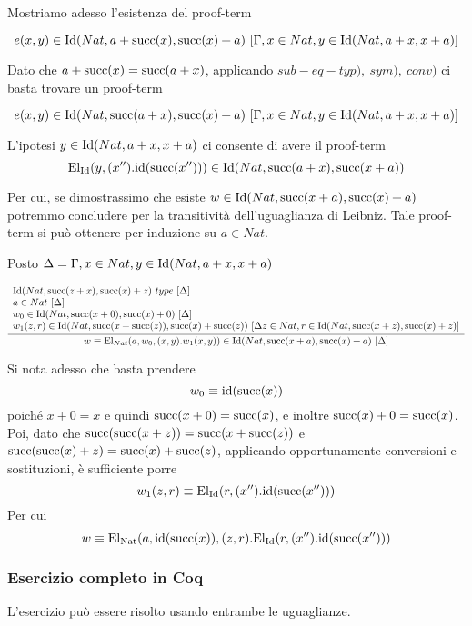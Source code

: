 Mostriamo adesso l'esistenza del proof-term 

\[e(x, y)\in \mathrm{Id}(Nat, a+\mathrm{succ}(x), \mathrm{succ}(x)+a)\ [\Gamma, x\in Nat, y\in \mathrm{Id}(Nat, a+x, x+a)]\]

Dato che $a+\mathrm{succ}(x) = \mathrm{succ}(a+x)$, applicando $sub-eq-typ),\ sym),\ conv)$ ci basta trovare un proof-term

\[e(x, y)\in \mathrm{Id}(Nat, \mathrm{succ}(a+x), \mathrm{succ}(x)+a)\ [\Gamma, x\in Nat, y\in \mathrm{Id}(Nat, a+x, x+a)]\]

L'ipotesi $y \in \mathrm{Id}(Nat, a+x, x+a)$ ci consente di avere il proof-term
\[ \mathrm{El}_{\mathrm{Id}}(y, (x'').\mathrm{id}(\mathrm{succ}(x''))) \in \mathrm{Id}(Nat, \mathrm{succ}(a+x), \mathrm{succ}(x+a))\]

Per cui, se dimostrassimo che esiste $w \in \mathrm{Id}(Nat, \mathrm{succ}(x+a), \mathrm{succ}(x)+a)$ potremmo concludere per la transitività dell'uguaglianza di Leibniz. Tale proof-term si può ottenere per induzione su $a\in Nat$.

Posto $\Delta = \Gamma, x\in Nat, y\in \mathrm{Id}(Nat, a+x, x+a)$

\begin{scriptsize}
	\[ \infer{w \equiv \mathrm{El}_{Nat}(a, w_0, (x, y).w_1(x,y)) \in \Id{Nat}{\suc{x+a}}{\suc{x}+a}\ [\Delta]}{\begin{array}{l}
		\Id{Nat}{\suc{z+x}}{\suc{x}+z}\ type\ [\Delta] \\ a\in Nat\ [\Delta] \\  w_0\in \Id{Nat}{\suc{x+0}}{\suc{x}+0}\ [\Delta] \\ w_1(z, r)\in \Id{Nat}{\suc{x+\suc{z}}}{\suc{x}+\suc{z}}\ [\Delta z\in Nat, r\in \Id{Nat}{\suc{x+z}}{\suc{x}+z}]\end{array}} \]
\end{scriptsize}

Si nota adesso che basta prendere
\[ w_0 \equiv \mathrm{id}(\mathrm{succ}(x))\] poiché $x+0 = x$ e quindi $\mathrm{succ}(x+0) = \mathrm{succ}(x)$, e inoltre $\mathrm{succ}(x)+0 = \mathrm{succ}(x)$. Poi, dato che $\mathrm{succ}(\mathrm{succ}(x+z)) = \mathrm{succ}(x+\mathrm{succ}(z))$ e $\mathrm{succ}(\mathrm{succ}(x)+z) = \mathrm{succ}(x)+\mathrm{succ}(z)$, applicando opportunamente conversioni e sostituzioni, è sufficiente porre
\[ w_1(z, r) \equiv \mathrm{El}_{\mathrm{Id}}(r, (x'').\mathrm{id}(\mathrm{succ}(x'')))\]
Per cui
\[w \equiv \mathrm{El}_{\mathrm{Nat}}(a, \mathrm{id}(\mathrm{succ}(x)), (z,r).\mathrm{El}_{\mathrm{Id}}(r, (x'').\mathrm{id}(\mathrm{succ}(x''))) \]

\subsubsection{Esercizio completo in Coq}
L'esercizio può essere risolto usando entrambe le uguaglianze.
